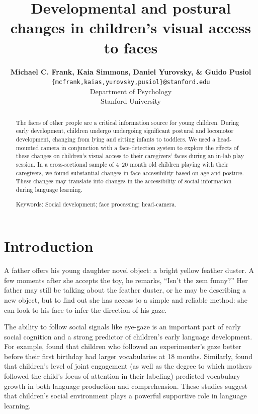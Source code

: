 \documentclass[10pt,letterpaper]{article}
\title{Developmental and postural changes in children's visual access to faces}
\author{{\large \bf Michael C. Frank, Kaia Simmons, Daniel Yurovsky, \& Guido Pusiol} \\
\texttt{\{mcfrank,kaias,yurovsky,pusiol\}@stanford.edu} \\
Department of Psychology \\
Stanford University}
\begin{document}
\maketitle

\begin{abstract} 

The faces of other people are a critical information source for young children. During early development, children undergo undergoing significant postural and locomotor development, changing from lying and sitting infants to toddlers. We used a head-mounted camera in conjunction with a face-detection system to explore the effects of these changes on children's visual access to their caregivers' faces during an in-lab play session. In a cross-sectional sample of 4--20 month old children playing with their caregivers, we found substantial changes in face accessibility based on age and posture. These changes may translate into changes in the accessibility of social information during language learning. 

{Keywords:} Social development; face processing; head-camera.
\end{abstract}

\section{Introduction}

A father offers his young daughter novel object: a bright yellow feather duster. A few moments after she accepts the toy, he remarks, ``Isn't the zem funny?'' Her father may still be talking about the feather duster, or he may be describing a new object, but to find out she has access to a simple and reliable method: she can look to his face to infer the direction of his gaze. 

The ability to follow social signals like eye-gaze is an important part of early social cognition \cite{scaife1975} and a strong predictor of children's early language development. For example,  found that children who followed an experimenter's gaze better before their first birthday had larger vocabularies at 18 months. Similarly,  found that children's level of joint engagement (as well as the degree to which mothers followed the child's focus of attention in their labeling) predicted vocabulary growth in both language production and comprehension. These studies suggest that children's social environment plays a powerful supportive role in language learning. 
\end{document}
